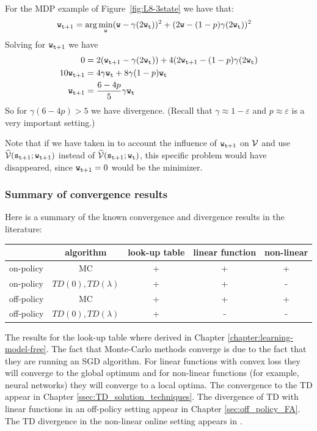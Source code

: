 For the MDP example of Figure~\ref{fig:L8-3state} we have that:
\begin{align*}
 {\tt w}_{{\tt t}+1} &= \arg\min_{\tt w} ({\tt w}-\gamma(2{\tt w}_{\tt t}))^2+(2{\tt w}-(1-p)\gamma(2{\tt w}_{\tt t}))^2
\end{align*}
Solving for ${\tt w}_{{\tt t}+1}$ we have
\begin{align*}
0&=  2({\tt w}_{{\tt t}+1}-\gamma(2{\tt w}_{\tt t}))+4(2{\tt w}_{{\tt t}+1}-(1-p)\gamma(2{\tt w}_{\tt t})\\
  10 {\tt w}_{{\tt t}+1}&=4\gamma {\tt w}_{\tt t} + 8\gamma(1-p){\tt w}_{\tt t}\\
  {\tt w}_{{\tt t}+1}&=\frac{6-4p}{5}\gamma {\tt w}_{\tt t}
\end{align*}
So for $\gamma(6-4p)>5$ we have divergence. (Recall that
$\gamma\approx 1-\varepsilon$ and $p\approx \varepsilon$ is a very
important setting.)

Note that if we have taken in to account the influence of
${\tt w}_{{\tt t}+1}$ on $\mathcal{V}$ and use
$\widehat{\mathcal{V}}({\tt s}_{{\tt t}+1};{\tt w}_{{\tt t}+1})$ instead of
$\widehat{\mathcal{V}}({\tt s}_{{\tt t}+1};{\tt w}_{\tt t})$, this specific
problem would have disappeared, since ${\tt w}_{{\tt t}+1}=0$ would
be the minimizer.

\subsubsection{Summary of convergence results} Here is a summary of the known convergence and divergence results in
the literature:
\begin{center}
  \begin{tabular}{ | l | c | c|c|c| }
    \hline
    & algorithm & look-up table&linear function&non-linear\\ \hline
    on-policy & MC & + & + & + \\ \hline
    on-policy & $TD(0),TD(\lambda)$ & + & + & -\\ \hline
    off-policy & MC & + & + & + \\ \hline
    off-policy & $TD(0),TD(\lambda)$ & + & - & -\\ \hline
  \end{tabular}
\end{center}

The results for the look-up table where derived in Chapter
\ref{chapter:learning-model-free}.
%
The fact that Monte-Carlo methods converge is due to the fact that
they are running an SGD algorithm. For linear functions with convex
loss they will converge to the global optimum and for non-linear
functions (for example, neural networks) they will converge to a
local optima. The convergence to the TD appear in Chapter
\ref{ssec:TD_solution_techniques}. The divergence of TD with linear functions in
an off-policy setting appear in Chapter \ref{sec:off_policy_FA}. The TD
divergence in the non-linear online setting appears in
\cite{TsitsiklisVR97}.
